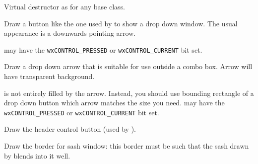 
Virtual destructor as for any base class.


\label{wxrenderernativedrawcomboboxdropbutton}


Draw a button like the one used by  to show a
drop down window. The usual appearance is a downwards pointing arrow.

 may have the \texttt{wxCONTROL\_PRESSED} or \texttt{wxCONTROL\_CURRENT} bit set.


\label{wxrenderernativedrawdroparrow}


Draw a drop down arrow that is suitable for use outside a combo box. Arrow will have
transparent background.

 is not entirely filled by the arrow. Instead, you should use bounding
rectangle of a drop down button which arrow matches the size you need.
 may have the \texttt{wxCONTROL\_PRESSED} or \texttt{wxCONTROL\_CURRENT} bit set.


\label{wxrenderernativedrawheaderbutton}


Draw the header control button (used by ).


\label{wxrenderernativedrawsplitterborder}


Draw the border for sash window: this border must be such that the sash
drawn by  blends into it
well.


\label{wxrenderernativedrawsplittersash}

